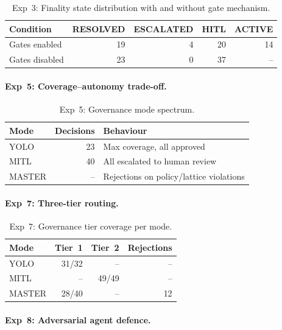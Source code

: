 \documentclass[11pt]{article}
\begin{document}
\begin{table}[H]
\centering
\small
\begin{tabular}{lrrrr}
\toprule
\textbf{Condition} & \textbf{RESOLVED} & \textbf{ESCALATED} & \textbf{HITL} & \textbf{ACTIVE} \\
\midrule
Gates enabled & 19 & 4 & 20 & 14 \\
Gates disabled & 23 & 0 & 37 & -- \\
\bottomrule
\end{tabular}
\caption{Exp~3: Finality state distribution with and without gate mechanism.}
\end{table}

\paragraph{Exp~5: Coverage--autonomy trade-off.}

\begin{table}[H]
\centering
\small
\begin{tabular}{lrl}
\toprule
\textbf{Mode} & \textbf{Decisions} & \textbf{Behaviour} \\
\midrule
YOLO & 23 & Max coverage, all approved \\
MITL & 40 & All escalated to human review \\
MASTER & -- & Rejections on policy/lattice violations \\
\bottomrule
\end{tabular}
\caption{Exp~5: Governance mode spectrum.}
\end{table}

\paragraph{Exp~7: Three-tier routing.}

\begin{table}[H]
\centering
\small
\begin{tabular}{lrrr}
\toprule
\textbf{Mode} & \textbf{Tier~1} & \textbf{Tier~2} & \textbf{Rejections} \\
\midrule
YOLO & 31/32 & -- & -- \\
MITL & -- & 49/49 & -- \\
MASTER & 28/40 & -- & 12 \\
\bottomrule
\end{tabular}
\caption{Exp~7: Governance tier coverage per mode.}
\end{table}

\paragraph{Exp~8: Adversarial agent defence.}
\end{document}

